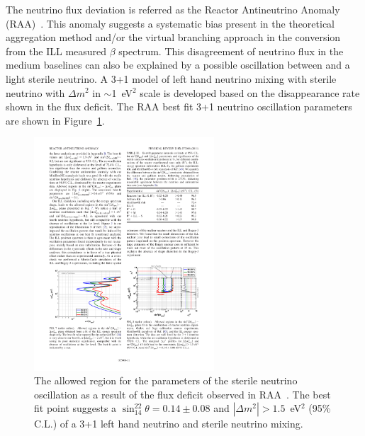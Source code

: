     The neutrino flux deviation is referred as the Reactor Antineutrino Anomaly (RAA)~\cite{bib:RAA}.
    This anomaly suggests a systematic bias present in the theoretical aggregation method and/or the virtual branching approach in the conversion from the ILL measured $\beta$ spectrum.
    This disagreement of neutrino flux in the medium baselines can also be explained by a possible oscillation between \nuebar and a light sterile neutrino.
    A 3+1 model of left hand neutrino mixing with sterile neutrino with $\Delta m^2$ in $\sim$1~eV$^2$ scale is developed based on the disappearance rate shown in the flux deficit.
    The RAA best fit 3+1 neutrino oscillation parameters are shown in Figure~\ref{fig:RAA}.
\begin{figure}[h!]
    \centering
    \includegraphics[width=0.6\textwidth]{Figures/RAA3plus1.pdf}
    \caption[The allowed region for the parameters of sterile oscillation]{The allowed region for the parameters of the sterile neutrino oscillation as a result of the flux deficit observed in RAA~\cite{bib:RAA}. The best fit point suggests a $\sin_{14}^22\theta = 0.14\pm0.08$ and $|\Delta m^2| > 1.5$~eV$^2$ (95\% C.L.) of a 3+1 left hand neutrino and sterile neutrino mixing.}
    \label{fig:RAA}
\end{figure}

